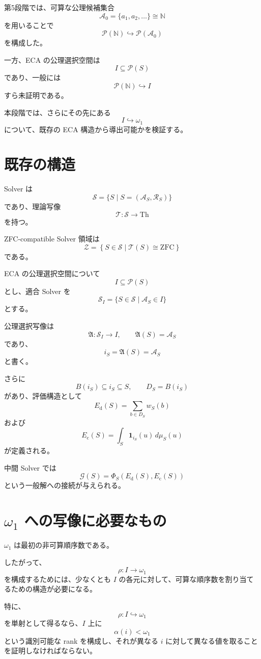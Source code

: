 \documentclass[a4paper,11pt]{article}
\newcommand{\Solver}{\mathcal{S}}
\newcommand{\Th}{\mathrm{Th}}
\newcommand{\Th}{\mathrm{Th}}
\begin{document}
第5段階では、可算な公理候補集合
\[
\mathcal{A}_0=\{a_1,a_2,\ldots\}\cong\mathbb{N}
\]
を用いることで
\[
\mathcal{P}(\mathbb{N})
\hookrightarrow
\mathcal{P}(\mathcal{A}_0)
\]
を構成した。

一方、ECA の公理選択空間は
\[
I\subseteq\mathcal{P}(S)
\]
であり、一般には
\[
\mathcal{P}(\mathbb{N})\hookrightarrow I
\]
すら未証明である。

本段階では、さらにその先にある
\[
I\hookrightarrow\omega_1
\]
について、既存の ECA 構造から導出可能かを検証する。

\section{既存の構造}

Solver は
\[
\Solver
=
\{S\mid S=(\mathcal{A}_S,\mathcal{R}_S)\}
\]
であり、理論写像
\[
\mathcal{T}:\Solver\longrightarrow\Th
\]
を持つ。

ZFC-compatible Solver 領域は
\[
\mathcal{Z}
=
\left\{
S\in\Solver\mid
\mathcal{T}(S)\cong\mathrm{ZFC}
\right\}
\]
である。

ECA の公理選択空間について
\[
I\subseteq\mathcal{P}(S)
\]
とし、適合 Solver を
\[
\mathcal{S}_I
=
\{S\in\Solver\mid\mathcal{A}_S\in I\}
\]
とする。

公理選択写像は
\[
\mathfrak{A}:\mathcal{S}_I\to I,
\qquad
\mathfrak{A}(S)=\mathcal{A}_S
\]
であり、
\[
i_S=\mathfrak{A}(S)=\mathcal{A}_S
\]
と書く。

さらに
\[
B(i_S)\subseteq i_S\subseteq S,
\qquad
D_S=B(i_S)
\]
があり、評価構造として
\[
E_{\mathrm{d}}(S)
=
\sum_{b\in D_S}w_S(b)
\]
および
\[
E_{\mathrm{c}}(S)
=
\int_S\mathbf 1_{i_S}(u)\,d\mu_S(u)
\]
が定義される。

中間 Solver では
\[
\mathcal{G}(S)
=
\Phi_S
\left(
E_{\mathrm{d}}(S),E_{\mathrm{c}}(S)
\right)
\]
という一般解への接続が与えられる。

\section{$\omega_1$ への写像に必要なもの}

$\omega_1$ は最初の非可算順序数である。

したがって、
\[
\rho:I\to\omega_1
\]
を構成するためには、少なくとも $I$ の各元に対して、可算な順序数を割り当てるための構造が必要になる。

特に、
\[
\rho:I\hookrightarrow\omega_1
\]
を単射として得るなら、$I$ 上に
\[
\alpha(i)<\omega_1
\]
という識別可能な rank を構成し、それが異なる $i$ に対して異なる値を取ることを証明しなければならない。
\end{document}
